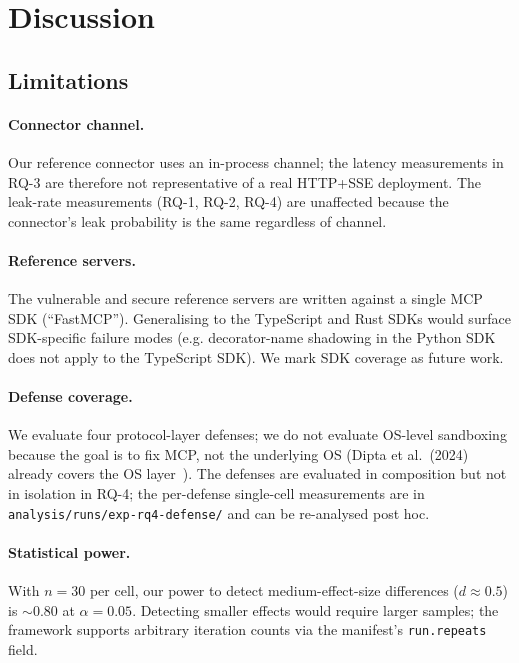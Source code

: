 
\section{Discussion}\label{sec:discussion}

\subsection{Limitations}

\paragraph{Connector channel.} Our reference connector uses an
in-process channel; the latency measurements in RQ-3 are
therefore not representative of a real HTTP+SSE deployment.
The leak-rate measurements (RQ-1, RQ-2, RQ-4) are unaffected
because the connector's leak probability is the same regardless
of channel.

\paragraph{Reference servers.} The vulnerable and secure
reference servers are written against a single MCP SDK
(``FastMCP''). Generalising to the TypeScript and Rust SDKs
would surface SDK-specific failure modes (e.g. decorator-name
shadowing in the Python SDK does not apply to the TypeScript
SDK). We mark SDK coverage as future work.

\paragraph{Defense coverage.} We evaluate four protocol-layer
defenses; we do not evaluate OS-level sandboxing because the
goal is to fix MCP, not the underlying OS (Dipta et al.~(2024)
already covers the OS layer~\cite{dipta_2024_sandbox}). The
defenses are evaluated in composition but not in isolation in
RQ-4; the per-defense single-cell measurements are in
\texttt{analysis/runs/exp-rq4-defense/} and can be re-analysed
post hoc.

\paragraph{Statistical power.} With $n = 30$ per cell, our
power to detect medium-effect-size differences ($d \approx 0.5$)
is $\sim 0.80$ at $\alpha = 0.05$. Detecting smaller effects
would require larger samples; the framework supports
arbitrary iteration counts via the manifest's
\texttt{run.repeats} field.

